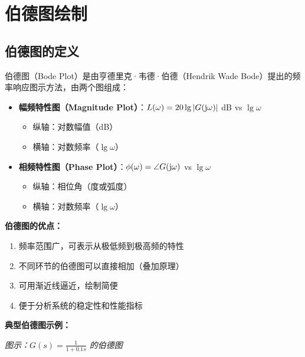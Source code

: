 \section{伯德图绘制}

\subsection{伯德图的定义}
伯德图（Bode Plot）是由亨德里克·韦德·伯德（Hendrik Wade Bode）提出的频率响应图示方法，由两个图组成：

\begin{minipage}[t]{0.55\textwidth}
\begin{itemize}
    \item \textbf{幅频特性图（Magnitude Plot）}：$L(\omega) = 20\lg|G(\mathrm{j}\omega)|$ dB vs $\lg\omega$
    \begin{itemize}
        \item 纵轴：对数幅值（dB）
        \item 横轴：对数频率（$\lg\omega$）
    \end{itemize}
    \item \textbf{相频特性图（Phase Plot）}：$\phi(\omega) = \angle G(\mathrm{j}\omega)$ vs $\lg\omega$
    \begin{itemize}
        \item 纵轴：相位角（度或弧度）
        \item 横轴：对数频率（$\lg\omega$）
    \end{itemize}
\end{itemize}

\textbf{伯德图的优点：}
\begin{enumerate}
    \item 频率范围广，可表示从极低频到极高频的特性
    \item 不同环节的伯德图可以直接相加（叠加原理）
    \item 可用渐近线逼近，绘制简便
    \item 便于分析系统的稳定性和性能指标
\end{enumerate}
\end{minipage}\hfill
\begin{minipage}[t]{0.42\textwidth}
\vspace{0pt}
\textbf{典型伯德图示例：}

\begin{center}
\small
{}
\end{center}
\vspace{-0.3cm}
\begin{center}
\small
\textit{图示：$G(s) = \frac{1}{1+0.1s}$ 的伯德图}
\end{center}
\end{minipage}

